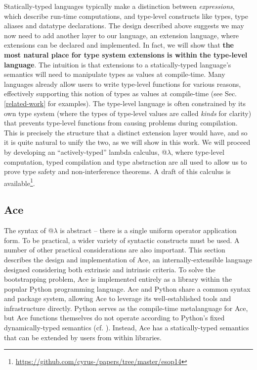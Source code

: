 Statically-typed languages typically make a distinction between \emph{expressions}, which describe run-time computations, and type-level constructs like types, type aliases and datatype declarations. The design described above suggests we may now need to add another layer to our language, an {extension language}, where extensions can be declared and implemented. In fact, we will show that \textbf{the most natural place for type system extensions is within the type-level language}. The intuition is that extensions to a statically-typed language's semantics will need to manipulate types as values at compile-time. Many languages already allow users to write type-level functions for various reasons, effectively supporting this notion of types as values at compile-time (see Sec. \ref{related-work} for examples). The type-level language is often constrained by its own type system (where the types of type-level values are called \emph{kinds} for clarity) that prevents type-level functions from causing problems during compilation. This is precisely the structure that a distinct extension layer would have, and so it is quite natural to unify the two, as we will show in this work.
We will proceed by developing an ``actively-typed'' lambda calculus, @$\lambda$, where type-level computation, typed compilation and type abstraction are all used to allow us to prove type safety and non-interference theorems. A draft of this calculus is available\footnote{\url{https://github.com/cyrus-/papers/tree/master/esop14}}.

\subsection{Ace}\label{ace}
The syntax of @$\lambda$ is abstract -- there is a single uniform operator application form. To be practical, a wider variety of syntactic constructs must be used. A number of other practical considerations are also important. This section describes the design and implementation of Ace, an internally-extensible language designed considering both extrinsic and intrinsic criteria. To solve the bootstrapping problem, Ace is implemented entirely as a library within the popular Python programming language. Ace and Python share a common syntax and package system, allowing Ace to leverage its well-established tools and infrastructure directly. Python serves as the compile-time metalanguage for Ace, but Ace functions themselves do not operate according to Python's fixed dynamically-typed semantics  (cf. \cite{Politz:2013:PFM:2509136.2509536,python}). Instead, Ace has a statically-typed semantics that can be extended by users from within libraries. 

